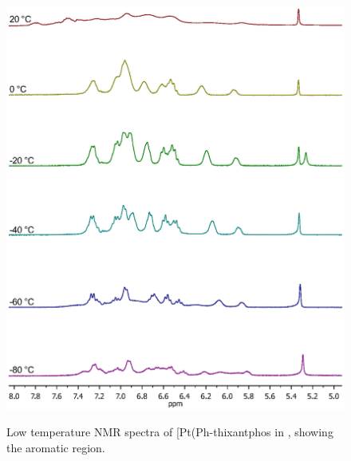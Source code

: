 \begin{figure}[htbp]
\begin{center}
\vspace{0.5cm}
\includegraphics[scale = 0.9, trim = 2cm 2.5cm 1.7cm 4cm, clip]{../NMR/1031.eps}
\caption[Low temperature \proton{} NMR spectra of [Pt(Ph-thixantphos\ce{)2}{]}]{Low temperature \proton{} NMR spectra of [Pt(Ph-thixantphos\ce{)2]} in , showing the aromatic region.}
\vspace{0.2cm}
\label{BisSPhPt:HNMR}
\end{center}
\end{figure}
\vspace{0.2cm}

